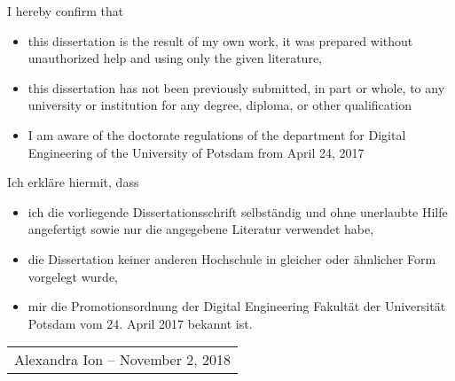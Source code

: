 

I hereby confirm that

\begin{itemize}
    \item this dissertation is the result of my own work, it was prepared without unauthorized help and using only the given literature,
    \item this dissertation has not been previously submitted, in part or whole, to any university or institution for any degree, diploma, or other qualification
    \item I am aware of the doctorate regulations of the department for Digital Engineering of the University of Potsdam from April 24, 2017
\end{itemize}

\vspace{25pt}

Ich erkläre hiermit, dass

\begin{itemize}
    \item ich die vorliegende Dissertationsschrift selbständig und ohne unerlaubte Hilfe angefertigt sowie nur die angegebene Literatur verwendet habe, 
    \item die Dissertation keiner anderen Hochschule in gleicher oder ähnlicher Form vorgelegt wurde, 
    \item mir die Promotionsordnung der Digital Engineering Fakultät der Universität Potsdam vom 24. April 2017 bekannt ist.
\end{itemize}


\begin{tabular}{ c }
    \rule{0pt}{60pt} \\
    \hline
    \rule{0pt}{15pt} \hspace{0.5cm} Alexandra Ion -- November 2, 2018 \hspace{0.5cm} \\
\end{tabular}


